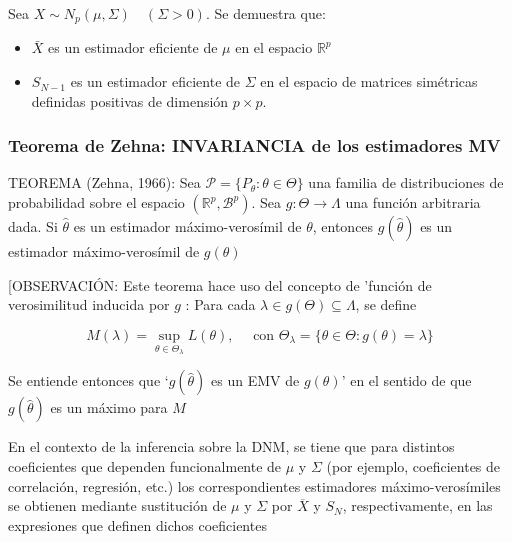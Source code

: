 \documentclass[11pt,a4paper]{article}
\begin{document}
Sea $X \sim N_{p}(\mu, \Sigma) \quad(\Sigma>0)$. Se demuestra que:
\begin{itemize}
\item $\bar{X}$ es un estimador eficiente de $\mu$ en el espacio $\mathbb{R}^{p}$
\item $S_{N-1}$ es un estimador eficiente de $\Sigma$ en el espacio de matrices simétricas definidas positivas de dimensión $p \times p$.
\end{itemize}

\subsubsection{Teorema de Zehna: INVARIANCIA de los estimadores MV}
TEOREMA (Zehna, 1966): Sea $\mathcal{P}=\{P_{\theta}: \theta \in \Theta\}$ una familia de distribuciones de probabilidad sobre el espacio $(\mathbb{R}^{p}, \mathcal{B}^{p})$. Sea $g: \Theta \rightarrow \Lambda$ una función arbitraria dada. Si $\hat{\theta}$ es un estimador máximo-verosímil de $\theta$, entonces $g(\hat{\theta})$ es un estimador máximo-verosímil de $g(\theta)$

[OBSERVACIÓN: Este teorema hace uso del concepto de 'función de verosimilitud inducida por $g$ : Para cada $\lambda \in g(\Theta) \subseteq \Lambda$, se define

$$M(\lambda)=\sup\limits_{\theta \in \Theta_{\lambda}} L(\theta), \quad \text{ con } \Theta_{\lambda}=\{\theta \in \Theta: g(\theta)=\lambda\}$$

Se entiende entonces que `$g(\hat{\theta})$ es un EMV de $g(\theta)$' en el sentido de que $g(\hat{\theta})$ es un máximo para $M$

En el contexto de la inferencia sobre la DNM, se tiene que para distintos coeficientes que dependen funcionalmente de $\mu$ y $\Sigma$ (por ejemplo, coeficientes de correlación, regresión, etc.) los correspondientes estimadores máximo-verosímiles se obtienen mediante sustitución de $\mu$ y $\Sigma$ por $\overline{X}$ y $S_{N}$, respectivamente, en las expresiones que definen dichos coeficientes
\end{document}
